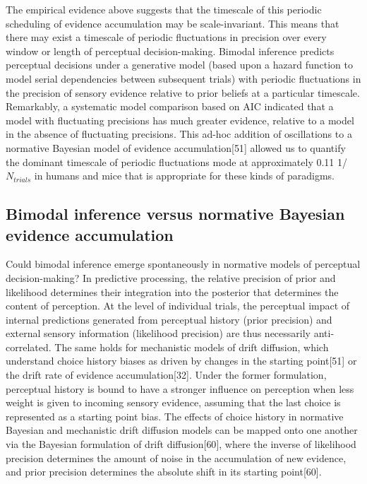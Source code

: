 \documentclass[
]{article}
\begin{document}
The empirical evidence above suggests that the timescale of this
periodic scheduling of evidence accumulation may be scale-invariant.
This means that there may exist a timescale of periodic fluctuations in
precision over every window or length of perceptual decision-making.
Bimodal inference predicts perceptual decisions under a generative model
(based upon a hazard function to model serial dependencies between
subsequent trials) with periodic fluctuations in the precision of
sensory evidence relative to prior beliefs at a particular timescale.
Remarkably, a systematic model comparison based on AIC indicated that a
model with fluctuating precisions has much greater evidence, relative to
a model in the absence of fluctuating precisions. This ad-hoc addition
of oscillations to a normative Bayesian model of evidence
accumulation{[}51{]} allowed us to quantify the dominant timescale of
periodic fluctuations mode at approximately 0.11 1/\(N_{trials}\) in
humans and mice that is appropriate for these kinds of paradigms.

\hypertarget{bimodal-inference-versus-normative-bayesian-evidence-accumulation}{%
\subsection{Bimodal inference versus normative Bayesian evidence
accumulation}\label{bimodal-inference-versus-normative-bayesian-evidence-accumulation}}

Could bimodal inference emerge spontaneously in normative models of
perceptual decision-making? In predictive processing, the relative
precision of prior and likelihood determines their integration into the
posterior that determines the content of perception. At the level of
individual trials, the perceptual impact of internal predictions
generated from perceptual history (prior precision) and external sensory
information (likelihood precision) are thus necessarily anti-correlated.
The same holds for mechanistic models of drift diffusion, which
understand choice history biases as driven by changes in the starting
point{[}51{]} or the drift rate of evidence accumulation{[}32{]}. Under
the former formulation, perceptual history is bound to have a stronger
influence on perception when less weight is given to incoming sensory
evidence, assuming that the last choice is represented as a starting
point bias. The effects of choice history in normative Bayesian and
mechanistic drift diffusion models can be mapped onto one another via
the Bayesian formulation of drift diffusion{[}60{]}, where the inverse
of likelihood precision determines the amount of noise in the
accumulation of new evidence, and prior precision determines the
absolute shift in its starting point{[}60{]}.
\end{document}
